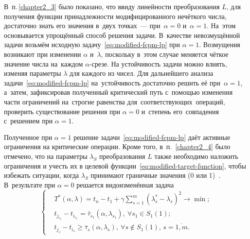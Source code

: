 В~п.\,\ref{chapter2_3} было показано, что ввиду линейности преобразования $L$, для получения функции принадлежности модифицированного нечёткого числа, достаточно знать его значения в~двух точках~--- при~$\alpha=0$ и~$\alpha=1$. На~этом основывается упрощённый способ решения задачи. В~качестве невозмущённой задачи возьмём исходную задачу~\eqref{eq:modified-fcpm-lp} при $\alpha=1$. Возмущения возникают при изменении $\alpha$ и~$\lambda$, поскольку в~этом случае меняется чёткое значение числа на~каждом $\alpha$-срезе. На устойчивость задачи можно влиять, изменяя параметры $\lambda$ для каждого из чисел. Для дальнейшего анализа задачи~\eqref{eq:modified-fcpm-lp} на~устойчивость достаточно решить её при~$\alpha=1$, а~затем, зафиксировав полученный критический путь с~помощью изменения части ограничений на~строгие равенства для~соответствующих~операций, проверить существование решения при $\alpha=0$ и~степень его~совпадения с~решением при $\alpha=1$.

Полученное при $\alpha=1$ решение задачи~\eqref{eq:modified-fcpm-lp} даёт активные ограничения на критические операции. Кроме того, в~п.~\ref{chapter2_4} было отмечено, что на параметры $\lambda_S$ преобразования $L$ также необходимо наложить ограничения и учесть их в целевой функции~\eqref{eq:modified-target-function}, чтобы избежать ситуации, когда $\lambda_S$ принимают граничные значения (0 или 1)~\cite{Vorontsov_VSTU}. В~результате при $\alpha=0$ решается видоизменённая задача
\begin{equation}
\label{eq:modified-fcpm-lp-alpha}
  \left \{ \begin{aligned}
    & T^* \left(\alpha, \lambda \right) = t_n-t_1+\gamma \sum \limits_{s=1}^{m} \left(\lambda_s^*-\lambda_s \right)^2 \to \min; \\
    & t_{j_{s_1}}-t_{i_{s_1}} = \bar{\tau}_{s_1}\left(\alpha, \lambda_{s_1} \right),\ \forall s_1 \in S_1\left(1\right); \\
    & t_{j_s}-t_{i_s} \geqslant \bar{\tau}_s\left(\alpha, \lambda_s \right),\ \forall s \notin S_1\left(1\right),\,s=\overline{1,m}.
  \end{aligned} \right.
\end{equation}

